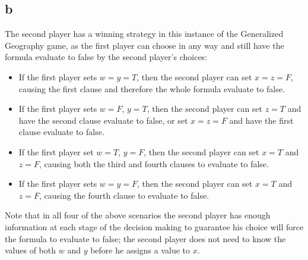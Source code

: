 \documentclass[letterpaper,notitlepage,twoside]{article}
\begin{document}
\subsection*{b}
The second player has a winning strategy in this instance of the Generalized Geography game, as the first player can choose in any way and still have the formula evaluate to false by the second player's choices: 
\begin{itemize}
\item If the first player sets $w=y=T$, then the second player can set $x=z=F$, causing the first clause and therefore the whole formula evaluate to false. \\
\item If the first player sets $w = F$, $y = T$, then the second player can set $z = T$ and have the second clause evaluate to false, or set $x = z = F$ and have the first clause evaluate to false. \\
\item If the first player set $w = T$, $y = F$, then the second player can set $x = T$ and $z = F$, causing both the third and fourth clauses to evaluate to false. \\
\item If the first player sets $w=y=F$, then the second player can set $x = T$ and $z = F$, causing the fourth clause to evaluate to false. \\
\end{itemize}
Note that in all four of the above scenarios the second player has enough information at each stage of the decision making to guarantee his choice will force the formula to evaluate to false; the second player does not need to know the values of both $w$ and $y$ before he assigns a value to $x$.
\end{document}
